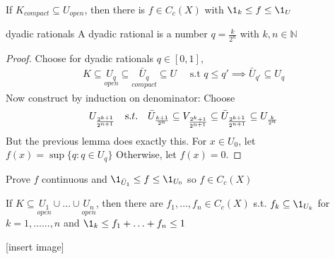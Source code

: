 \begin{lemma}
	If $K_{compact} \subseteq U_{open}$, then there is  $f \in C_{c} (X)$ with $\1_k \leq f \leq \1_U$
\end{lemma}

\begin{remark} dyadic rationals
		A dyadic rational is a number $q = \frac{k}{2^{n}}$ with $k,n \in \mathbb{N}$
\end{remark}

\begin{proof}
	Choose for dyadic rationals $q \in [0,1]$,
	\begin{align*}
		K \subseteq  {\underset {open} {U_{q}}} \subseteq {\underset {compact} {\bar{U}_{q}}} \subseteq U \quad \text{ s.t }
		q \leq q' \implies \bar{U}_{q'} \subseteq U_{q}
	\end{align*}
	Now construct by induction on denominator: Choose
	\begin{align*}
		U_{\frac{2^{k+1}}{2^{n+1}}} \quad {\text s.t. }\quad
		\bar{U}_{\frac{k+1}{2^{n}}} \subseteq V_{\frac{2^{k} + 1}{2^{n+1}}} \subseteq \bar{U}_{\frac{2^{k+1}}{2^{n+1}}} \subseteq U_{\frac{k}{2^{n}}}
	\end{align*}
	But the previous lemma does exactly this. For $x \in U_{0}$, let $f(x) = \sup\{q : q \in U_{q}\}$
	Otherwise, let $f(x) = 0$.
\end{proof}

\begin{exercise}
	Prove $f$ continuous and $\1_{\bar{U}_1} \leq f \leq \1_{U_{0}}$ so $f \in C_c(X)$
\end{exercise}


\begin{lemma}
	If $K \subseteq \underset{open}{U_{1}} \cup \ldots \cup \underset{open}{U_n}$, then there are
	$f_1, \ldots, f_n \in C_c(X)$ s.t. $f_k \subseteq \1_{U_{k}}$ for $k = 1, \ldots ..., n$ and
	$\1_k \leq f_1 + \ldots+ f_n \leq 1$
\end{lemma}

[insert image]

